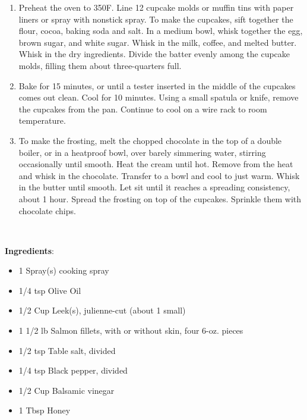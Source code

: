 \documentclass[11pt, twoside, openany]{book}
\begin{document}
\vspace{-3mm}\begin{enumerate}\setlength\itemsep{-1mm}
\item Preheat the oven to 350F. Line 12 cupcake molds or muffin tins with paper liners or spray with nonstick spray. To make the cupcakes, sift together the flour, cocoa, baking soda and salt. In a medium bowl, whisk together the egg, brown sugar, and white sugar. Whisk in the milk, coffee, and melted butter. Whisk in the dry ingredients. Divide the batter evenly among the cupcake molds, filling them about three-quarters full.
\item Bake for 15 minutes, or until a tester inserted in the middle of the cupcakes comes out clean. Cool for 10 minutes. Using a small spatula or knife, remove the cupcakes from the pan. Continue to cool on a wire rack to room temperature.
\item To make the frosting, melt the chopped chocolate in the top of a double boiler, or in a heatproof bowl, over barely simmering water, stirring occasionally until smooth. Heat the cream until hot. Remove from the heat and whisk in the chocolate. Transfer to a bowl and cool to just warm. Whisk in the butter until smooth. Let sit until it reaches a spreading consistency, about 1 hour. Spread the frosting on top of the cupcakes. Sprinkle them with chocolate chips.
\end{enumerate}
 \label{honey-balasamic-salmon}\hfill\textit{}\\
\begin{minipage}[t]{0.8\linewidth}
\textbf{Ingredients}:\vspace{-3mm}
\begin{multicols}{2}
\begin{itemize}\setlength\itemsep{-1mm}
\item 1 Spray(s) cooking spray
\item 1/4 tsp Olive Oil
\item 1/2 Cup Leek(s), julienne-cut (about 1 small)
\item 1 1/2 lb Salmon fillets, with or without skin, four 6-oz. pieces
\item 1/2 tsp Table salt, divided
\item 1/4 tsp Black pepper, divided
\item 1/2 Cup Balsamic vinegar
\item 1 Tbsp Honey
\end{itemize}
\end{multicols}
\end{minipage}
\end{document}
